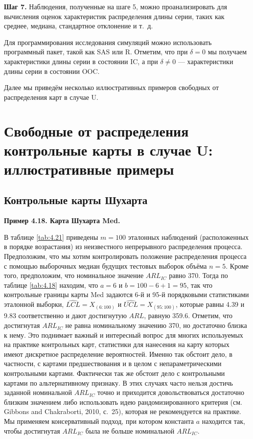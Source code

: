 \noindent\textbf{Шаг 7.} Наблюдения, полученные на шаге 5, можно проанализировать для вычисления оценок характеристик распределения длины серии, таких как среднее, медиана, стандартное отклонение и т.~д. 

Для программирования исследования симуляций можно использовать программный пакет, такой как SAS или R. Отметим, что при \(\delta = 0\) мы получаем характеристики длины серии в состоянии IC, а при \(\delta \ne 0\) --- характеристики длины серии в состоянии OOC.

Далее мы приведём несколько иллюстративных примеров свободных от распределения карт в случае U.

\section{Свободные от распределения контрольные карты в случае U: иллюстративные примеры}
\subsection{Контрольные карты Шухарта}

\noindent\textbf{Пример 4.18. Карта Шухарта Med.}

В таблице \ref{tab:4.21} приведены \(m = 100\) эталонных наблюдений (расположенных в порядке возрастания) из неизвестного непрерывного распределения процесса. Предположим, что мы хотим контролировать положение распределения процесса с помощью выборочных медиан будущих тестовых выборок объёма \(n = 5\). Кроме того, предположим, что номинальное значение \(ARL_{IC}\) равно 370. Тогда по таблице \ref{tab:4.18} находим, что \(a = 6\) и \(b = 100 - 6 + 1 = 95\), так что контрольные границы карты Med задаются 6-й и 95-й порядковыми статистиками эталонной выборки, \(\widehat{LCL} = X_{(6:100)}\) и \(\widehat{UCL} = X_{(95:100)}\), которые равны 4.39 и 9.83 соответственно и дают достигнутую \(ARL\), равную 359.6. Отметим, что достигнутая \(ARL_{IC}\) не равна номинальному значению 370, но достаточно близка к нему. Это поднимает важный и интересный вопрос для многих используемых на практике контрольных карт, статистики для нанесения на карту которых имеют дискретное распределение вероятностей. Именно так обстоит дело, в частности, с картами предшествования и в целом с непараметрическими контрольными картами. Фактически так же обстоит дело с контрольными картами по альтернативному признаку. В этих случаях часто нельзя достичь заданной номинальной \(ARL_{IC}\) точно и приходится довольствоваться достаточно близким значением либо использовать идею рандомизированного критерия (см. Gibbons and Chakraborti, 2010, с.~25), которая не рекомендуется на практике. Мы применяем консервативный подход, при котором константа \(a\) находится так, чтобы достигнутая \(ARL_{IC}\) была не больше номинальной \(ARL_{IC}\).

